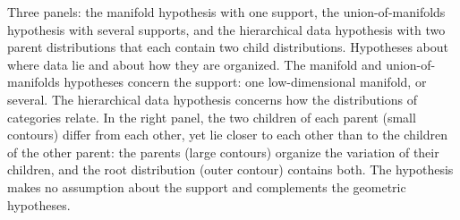 \documentclass[11pt]{article}
\begin{document}

\begin{publicationhead}
\makepublicationtitle
\end{publicationhead}

  {Three panels: the manifold hypothesis with one support, the union-of-manifolds hypothesis with several supports, and the hierarchical data hypothesis with two parent distributions that each contain two child distributions.}
  {Hypotheses about where data lie and about how they are organized. The manifold and union-of-manifolds hypotheses concern the support: one low-dimensional manifold, or several. The hierarchical data hypothesis concerns how the distributions of categories relate. In the right panel, the two children of each parent (small contours) differ from each other, yet lie closer to each other than to the children of the other parent: the parents (large contours) organize the variation of their children, and the root distribution (outer contour) contains both. The hypothesis makes no assumption about the support and complements the geometric hypotheses.}
\end{document}

